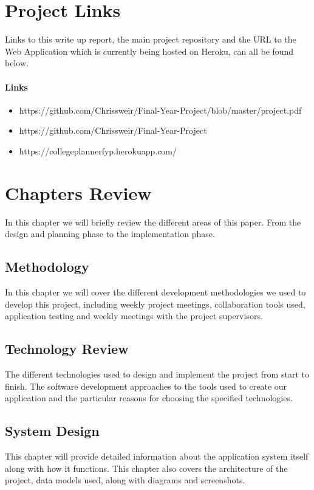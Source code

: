 \section{Project Links}
Links to this write up report, the main project repository and the URL to the Web Application which is currently being hosted on Heroku, can all be found below.

\paragraph{Links}
\begin{itemize}
\item https://github.com/Chrissweir/Final-Year-Project/blob/master/project.pdf
\item https://github.com/Chrissweir/Final-Year-Project
\item https://collegeplannerfyp.herokuapp.com/
\end{itemize}

\section{Chapters Review}
In this chapter we will briefly review the different areas of this paper. From the design and planning phase to the implementation phase.

\subsection{Methodology}
In this chapter we will cover the different development methodologies we used to develop this project, including weekly project meetings, collaboration tools used, application testing and weekly meetings with the project supervisors.

\subsection{Technology Review}
The different technologies used to design and implement the project from start to finish. The software development approaches to the tools used to create our application and the particular reasons for choosing the specified technologies.

\subsection{System Design}
This chapter will provide detailed information about the application system itself along with how it functions. This chapter also covers the architecture of the project, data models used, along with diagrams and screenshots.

